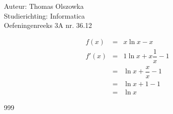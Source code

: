 \documentclass[a4paper]{article}
\begin{document}
\noindent \large Auteur: Thomas Olszowka \\
\noindent \large Studierichting: Informatica\\
\noindent \large Oefeningenreeks 3A nr. 36.12\\

\medskip

\normalsize

\begin{eqnarray*}
f(x)    & = & x \ln x - x \\
f'(x)   & = & 1 \ln x + x \dfrac{1}{x} - 1  \\
        & = & \ln x + \dfrac{x}{x} - 1 \\
        & = & \ln x + 1 - 1 \\
        & = & \ln x  
\end{eqnarray*}

\begin{thebibliography}{999}
\end{thebibliography}
\end{document}

